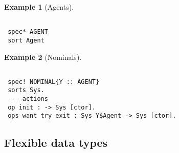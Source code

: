 \documentclass{article}
\newtheorem{example}{Example}
\begin{document}
\begin{example}[Agents]
\begin{verbatim}
 
 spec* AGENT
 sort Agent
\end{verbatim}
\end{example}

\begin{example}[Nominals]
\begin{verbatim} 

 spec! NOMINAL{Y :: AGENT}
 sorts Sys.
 --- actions
 op init : -> Sys [ctor].
 ops want try exit : Sys Y$Agent -> Sys [ctor].
\end{verbatim}
\end{example}


\subsection{Flexible data types}
\end{document}
